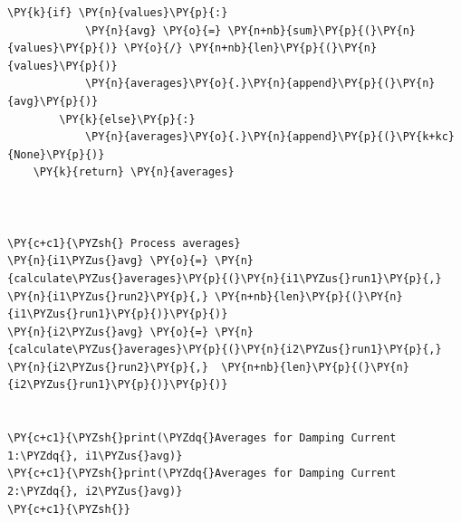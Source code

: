 \begin{tcolorbox}[breakable, size=fbox, boxrule=1pt, pad at break*=1mm,colback=cellbackground, colframe=cellborder]
\begin{Verbatim}[commandchars=\\\{\}]
        \PY{k}{if} \PY{n}{values}\PY{p}{:}
            \PY{n}{avg} \PY{o}{=} \PY{n+nb}{sum}\PY{p}{(}\PY{n}{values}\PY{p}{)} \PY{o}{/} \PY{n+nb}{len}\PY{p}{(}\PY{n}{values}\PY{p}{)}
            \PY{n}{averages}\PY{o}{.}\PY{n}{append}\PY{p}{(}\PY{n}{avg}\PY{p}{)}
        \PY{k}{else}\PY{p}{:}
            \PY{n}{averages}\PY{o}{.}\PY{n}{append}\PY{p}{(}\PY{k+kc}{None}\PY{p}{)}
    \PY{k}{return} \PY{n}{averages}



\PY{c+c1}{\PYZsh{} Process averages}
\PY{n}{i1\PYZus{}avg} \PY{o}{=} \PY{n}{calculate\PYZus{}averages}\PY{p}{(}\PY{n}{i1\PYZus{}run1}\PY{p}{,} \PY{n}{i1\PYZus{}run2}\PY{p}{,} \PY{n+nb}{len}\PY{p}{(}\PY{n}{i1\PYZus{}run1}\PY{p}{)}\PY{p}{)}
\PY{n}{i2\PYZus{}avg} \PY{o}{=} \PY{n}{calculate\PYZus{}averages}\PY{p}{(}\PY{n}{i2\PYZus{}run1}\PY{p}{,} \PY{n}{i2\PYZus{}run2}\PY{p}{,}  \PY{n+nb}{len}\PY{p}{(}\PY{n}{i2\PYZus{}run1}\PY{p}{)}\PY{p}{)}


\PY{c+c1}{\PYZsh{}print(\PYZdq{}Averages for Damping Current 1:\PYZdq{}, i1\PYZus{}avg)}
\PY{c+c1}{\PYZsh{}print(\PYZdq{}Averages for Damping Current 2:\PYZdq{}, i2\PYZus{}avg)}
\PY{c+c1}{\PYZsh{}}
\end{Verbatim}
\end{tcolorbox}

